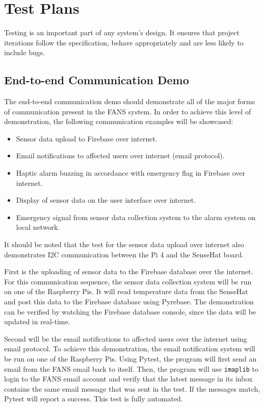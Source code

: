 \section{Test Plans}

Testing is an important part of any system's design. It ensures that project iterations follow the specification,
behave appropriately and are less likely to include bugs.

\subsection{End-to-end Communication Demo}

The end-to-end communication demo should demonstrate all of the major forms of communication present in the FANS
system. In order to achieve this level of demonstration, the following communication examples will be showcased:

\begin{itemize}
    \item Sensor data upload to Firebase over internet.
    \item Email notifications to affected users over internet (email protocol).
    \item Haptic alarm buzzing in accordance with emergency flag in Firebase over internet.
    \item Display of sensor data on the user interface over internet.
    \item Emergency signal from sensor data collection system to the alarm system on local network.
\end{itemize}

It should be noted that the test for the sensor data upload over internet also demonstrates I2C communication between
the Pi 4 and the SenseHat board.

First is the uploading of sensor data to the Firebase database over the internet. For this communication sequence, the
sensor data collection system will be run on one of the Raspberry Pis. It will read temperature data from the SenseHat
and post this data to the Firebase database using Pyrebase. The demonstration can be verified by watching the Firebase
database console, since the data will be updated in real-time.

Second will be the email notifications to affected users over the internet using email protocol. To achieve this
demonstration, the email notification system will be run on one of the Raspberry Pis. Using Pytest, the program will
first send an email from the FANS email back to itself. Then, the program will use \texttt{imaplib} to login to the
FANS email account and verify that the latest message in its inbox contains the same email message that was sent in the
test. If the messages match, Pytest will report a success. This test is fully automated.

